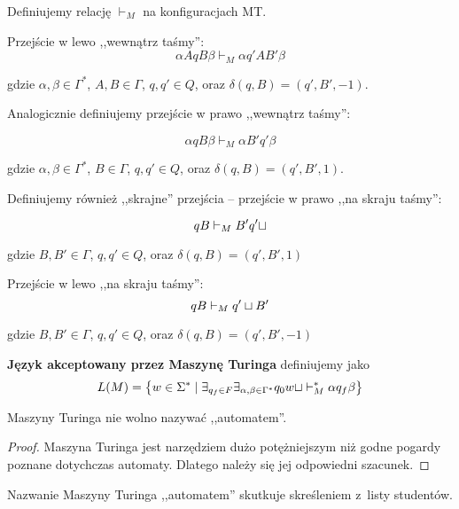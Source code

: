 \begin{definition}
	Definiujemy relację \( \vdash_M \) na konfiguracjach MT.

	Przejście w lewo ,,wewnątrz taśmy'':
	\[
		\alpha A q B \beta
		\vdash_M
		\alpha q' A B' \beta
	\]

	gdzie \(\alpha, \beta \in \Gamma^*\), \(A, B \in \Gamma\), \(q, q'\in Q\), oraz \(\delta(q, B) = (q', B', -1)\).

	Analogicznie definiujemy przejście w prawo ,,wewnątrz taśmy'':

	\[
		\alpha q B \beta
		\vdash_M
		\alpha B' q' \beta
	\]

	gdzie \(\alpha, \beta \in \Gamma^*\), \(B \in \Gamma\), \(q, q'\in Q\), oraz \(   \delta(q, B) = (q', B', 1) \).

	Definiujemy również ,,skrajne'' przejścia -- przejście w prawo ,,na skraju taśmy'':

	\[
		q B
		\vdash_M
		B' q' \sqcup
	\]

	gdzie \(B, B' \in \Gamma\), \(q, q' \in Q\), oraz \( \delta(q, B) = (q', B', 1) \)

	Przejście w lewo ,,na skraju taśmy'':
	\[
		q B
		\vdash_M
		q' \sqcup B'
	\]

	gdzie \(B, B' \in \Gamma\), \(q, q' \in Q\), oraz \( \delta(q, B) = (q', B', -1)\)


\end{definition}


\begin{definition}
	\textbf{Język akceptowany przez Maszynę Turinga} definiujemy jako
	\[
		L(M) = \set{w \in \Sigma^* \mid \exists_{q_f \in F} \exists_{\alpha, \beta \in \Gamma^*} q_0w\blank \vdash_M^* \alpha q_f \beta}
	\]
\end{definition}

\begin{theorem}
	Maszyny Turinga nie wolno nazywać ,,automatem''.
\end{theorem}
\begin{proof}
	Maszyna Turinga jest narzędziem dużo potężniejszym niż godne pogardy poznane dotychczas automaty. Dlatego należy się jej odpowiedni szacunek.
\end{proof}
\begin{corollary}
	Nazwanie Maszyny Turinga ,,automatem'' skutkuje skreśleniem z~listy studentów.
\end{corollary}